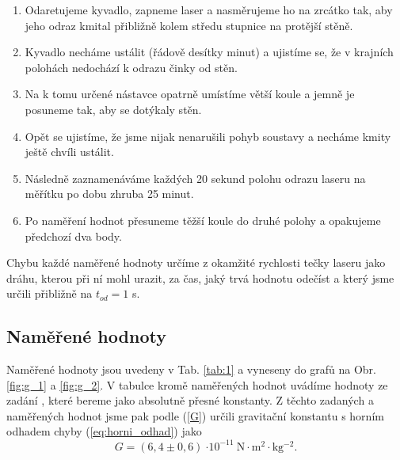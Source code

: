 \documentclass[english]{article}
\newcommand{\unit}[1]{\mathrm{#1}}
\begin{document}
			\begin{enumerate}
			    \item Odaretujeme kyvadlo, zapneme laser a nasměrujeme ho na zrcátko tak, aby jeho odraz kmital přibližně kolem středu stupnice na protější stěně.
			    \item Kyvadlo necháme ustálit (řádově desítky minut) a ujistíme se, že v krajních polohách nedochází k odrazu činky od stěn. 
			    \item Na k tomu určené nástavce opatrně umístíme větší koule a jemně je posuneme tak, aby se dotýkaly stěn. 
			    \item Opět se ujistíme, že jsme nijak nenarušili pohyb soustavy a necháme kmity ještě chvíli ustálit.
			    \item Následně zaznamenáváme každých 20 sekund polohu odrazu laseru na měřítku po dobu zhruba 25 minut.
			    \item Po naměření hodnot přesuneme těžší koule do druhé polohy a opakujeme předchozí dva body.
			\end{enumerate}
			
			Chybu každé naměřené hodnoty určíme z okamžité rychlosti tečky laseru jako dráhu, kterou při ní mohl urazit, za čas, jaký trvá hodnotu odečíst a  který jsme určili přibližně na $t_{od} = 1 $ s.
		
	\subsection{Naměřené hodnoty}
		Naměřené hodnoty jsou uvedeny v Tab. \ref{tab:1} a vyneseny do grafů na Obr. \ref{fig:g_1} a \ref{fig:g_2}. V tabulce kromě naměřených hodnot uvádíme hodnoty ze zadání \cite{bib:zadani}, které bereme jako absolutně přesné konstanty. Z těchto zadaných a naměřených hodnot jsme pak podle (\ref{G}) určili gravitační konstantu s horním odhadem chyby (\ref{eq:horni_odhad}) jako
		\begin{equation}
		G = (6,4 \pm 0,6)\ \unit{\cdot 10^{-11}\ N\cdot m^2\cdot kg^{-2}}.
		\end{equation}
		
\end{document}
